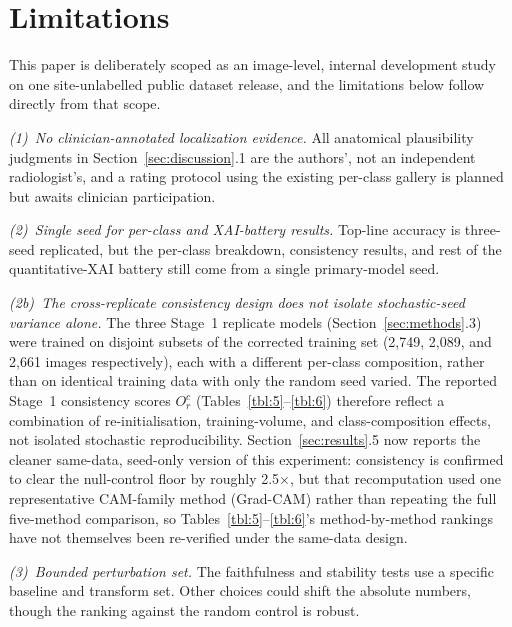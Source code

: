 \section{Limitations}
\label{sec:limitations}

This paper is deliberately scoped as an image-level, internal development study on one site-unlabelled public dataset release, and the limitations below follow directly from that scope.

\textit{(1)~No clinician-annotated localization evidence.} All anatomical plausibility judgments in Section~\ref{sec:discussion}.1 are the authors', not an independent radiologist's, and a rating protocol using the existing per-class gallery is planned but awaits clinician participation.

\textit{(2)~Single seed for per-class and XAI-battery results.} Top-line accuracy is three-seed replicated, but the per-class breakdown, consistency results, and rest of the quantitative-XAI battery still come from a single primary-model seed.

\textit{(2b)~The cross-replicate consistency design does not isolate stochastic-seed variance alone.} The three Stage~1 replicate models (Section~\ref{sec:methods}.3) were trained on disjoint subsets of the corrected training set (2,749, 2,089, and 2,661 images respectively), each with a different per-class composition, rather than on identical training data with only the random seed varied. The reported Stage~1 consistency scores $O_r^c$ (Tables~\ref{tbl:5}--\ref{tbl:6}) therefore reflect a combination of re-initialisation, training-volume, and class-composition effects, not isolated stochastic reproducibility. Section~\ref{sec:results}.5 now reports the cleaner same-data, seed-only version of this experiment: consistency is confirmed to clear the null-control floor by roughly 2.5$\times$, but that recomputation used one representative CAM-family method (Grad-CAM) rather than repeating the full five-method comparison, so Tables~\ref{tbl:5}--\ref{tbl:6}'s method-by-method rankings have not themselves been re-verified under the same-data design.

\textit{(3)~Bounded perturbation set.} The faithfulness and stability tests use a specific baseline and transform set. Other choices could shift the absolute numbers, though the ranking against the random control is robust.


